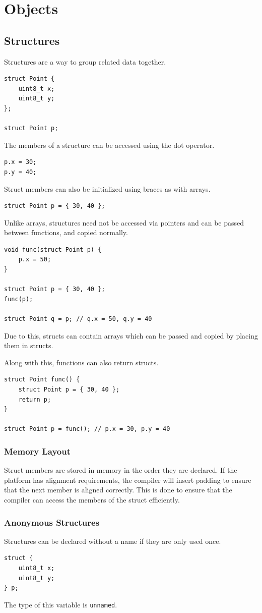 \documentclass[a4paper]{report}
\begin{document}
\chapter{Objects}
\section{Structures}
Structures are a way to group related data together.
\begin{verbatim}
struct Point {
    uint8_t x;
    uint8_t y;
};

struct Point p;
\end{verbatim}
The members of a structure can be accessed using the dot operator.
\begin{verbatim}
p.x = 30;
p.y = 40;
\end{verbatim}
Struct members can also be initialized using braces as with arrays.
\begin{verbatim}
struct Point p = { 30, 40 };
\end{verbatim}
Unlike arrays, structures need not be accessed via pointers and can be passed between functions,
and copied normally.
\begin{verbatim}
void func(struct Point p) {
    p.x = 50;
}

struct Point p = { 30, 40 };
func(p);

struct Point q = p; // q.x = 50, q.y = 40
\end{verbatim}
Due to this, structs can contain arrays which can be passed and copied by placing them
in structs.

Along with this, functions can also return structs.
\begin{verbatim}
struct Point func() {
    struct Point p = { 30, 40 };
    return p;
}

struct Point p = func(); // p.x = 30, p.y = 40
\end{verbatim}
\subsection{Memory Layout}
Struct members are stored in memory in the order they are declared.
If the platform has alignment requirements, the compiler will insert padding
to ensure that the next member is aligned correctly. This is done to
ensure that the compiler can access the members of the struct efficiently.
\subsection{Anonymous Structures}
Structures can be declared without a name if they are only used once.
\begin{verbatim}
struct {
    uint8_t x;
    uint8_t y;
} p;
\end{verbatim}
The type of this variable is \texttt{unnamed}.
\end{document}
